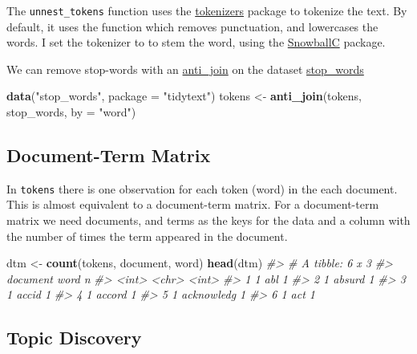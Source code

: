 \documentclass[]{book}
\newenvironment{Shaded}{\begin{snugshade}}{\end{snugshade}}
\newcommand{\KeywordTok}[1]{\textcolor[rgb]{0.13,0.29,0.53}{\textbf{#1}}}
\newcommand{\DataTypeTok}[1]{\textcolor[rgb]{0.13,0.29,0.53}{#1}}
\newcommand{\StringTok}[1]{\textcolor[rgb]{0.31,0.60,0.02}{#1}}
\newcommand{\CommentTok}[1]{\textcolor[rgb]{0.56,0.35,0.01}{\textit{#1}}}
\newcommand{\NormalTok}[1]{#1}
\theoremstyle{definition}
\theoremstyle{definition}
\theoremstyle{definition}
\theoremstyle{remark}
\begin{document}
The \texttt{unnest\_tokens} function uses the
\href{https://cran.r-project.org/package=tokenizers}{tokenizers} package
to tokenize the text. By default, it uses the function which removes
punctuation, and lowercases the words. I set the tokenizer to to stem
the word, using the
\href{https://cran.r-project.org/package=SnowballC}{SnowballC} package.

We can remove stop-words with an
\href{https://www.rdocumentation.org/packages/dplyr/topics/anti_join}{anti\_join}
on the dataset
\href{https://www.rdocumentation.org/packages/tidytext/topics/stop_words}{stop\_words}

\begin{Shaded}
\begin{Highlighting}[]
\KeywordTok{data}\NormalTok{(}\StringTok{"stop_words"}\NormalTok{, }\DataTypeTok{package =} \StringTok{"tidytext"}\NormalTok{)}
\NormalTok{tokens <-}\StringTok{ }\KeywordTok{anti_join}\NormalTok{(tokens, stop_words, }\DataTypeTok{by =} \StringTok{"word"}\NormalTok{)}
\end{Highlighting}
\end{Shaded}

\subsection{Document-Term Matrix}\label{document-term-matrix}

In \texttt{tokens} there is one observation for each token (word) in the
each document. This is almost equivalent to a document-term matrix. For
a document-term matrix we need documents, and terms as the keys for the
data and a column with the number of times the term appeared in the
document.

\begin{Shaded}
\begin{Highlighting}[]
\NormalTok{dtm <-}\StringTok{ }\KeywordTok{count}\NormalTok{(tokens, document, word)}
\KeywordTok{head}\NormalTok{(dtm)}
\CommentTok{#> # A tibble: 6 x 3}
\CommentTok{#>   document word           n}
\CommentTok{#>      <int> <chr>      <int>}
\CommentTok{#> 1        1 abl            1}
\CommentTok{#> 2        1 absurd         1}
\CommentTok{#> 3        1 accid          1}
\CommentTok{#> 4        1 accord         1}
\CommentTok{#> 5        1 acknowledg     1}
\CommentTok{#> 6        1 act            1}
\end{Highlighting}
\end{Shaded}

\subsection{Topic Discovery}\label{topic-discovery}
\end{document}
